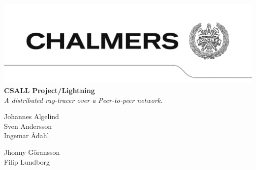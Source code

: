 \begin{titlepage}
\hspace*{-126pt}
\setlength{\voffset}{-129pt}
\enlargethispage{200pt}
\includegraphics[width=\paperwidth,keepaspectratio=true]{img/avancez.png}
\vspace*{130pt}\\
{\Huge\textbf{CSALL Project/Lightning}}
\vspace*{50pt}\\
\textit{A distributed ray-tracer over a Peer-to-peer network.}
\vspace*{30pt}\\
\begin{minipage}{0.4\textwidth}
\begin{flushleft}
Johannes Algelind\\
Sven Andersson\\
Ingemar Ådahl\\
\end{flushleft}
\end{minipage}
\begin{minipage}{0.4\textwidth}
\begin{flushleft}
Jhonny Göransson\\
Filip Lundborg\\
\end{flushleft}
\end{minipage}\\
\vspace*{110pt}\\
\end{titlepage}


